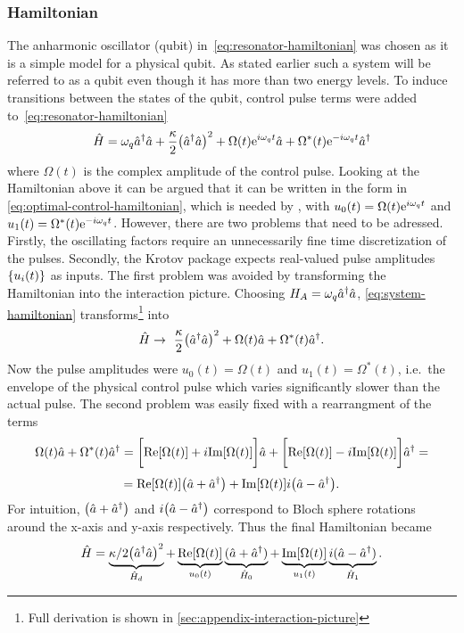 \documentclass[main.tex]{subfiles}
\begin{document}
\subsubsection{Hamiltonian}
The anharmonic oscillator (qubit) in~\cref{eq:resonator-hamiltonian} was chosen as it is a simple model for a physical qubit.
As stated earlier such a system will be referred to as a qubit even though it has more than two energy levels.
To induce transitions between the states of the qubit, control pulse terms were added to~\cref{eq:resonator-hamiltonian}
\begin{equation}
    \hat{H} = \omega_{q} \hat{a}^\dagger\hat{a} + \frac{\kappa}{2} \qty(\hat{a}^\dagger\hat{a})^2 + \Omega(t)\mathrm{e}^{i\omega_{q}t}\hat{a} + \Omega^*(t)\mathrm{e}^{-i\omega_{q}t}\hat{a}^\dagger
    \label{eq:system-hamiltonian}
\end{equation}
where \( \Omega(t) \) is the complex amplitude of the control pulse.
Looking at the Hamiltonian above it can be argued that it can be written in the form in \cref{eq:optimal-control-hamiltonian}, which is needed by \krotov{}, with \( u_0(t) = \Omega(t)\mathrm{e}^{i\omega_{q}t} \) and \( u_1(t) = \Omega^*(t)\mathrm{e}^{-i\omega_{q}t} \).
However, there are two problems that need to be adressed.
Firstly, the oscillating factors require an unnecessarily fine time discretization of the pulses.
Secondly, the Krotov package expects real-valued pulse amplitudes \( \qty{u_i(t)} \) as inputs.
The first problem was avoided by transforming the Hamiltonian into the interaction picture.
Choosing \( H_A = \omega_{q} \hat{a}^\dagger\hat{a} \), \cref{eq:system-hamiltonian} transforms\footnote{Full derivation is shown in \cref{sec:appendix-interaction-picture}} into
\begin{equation}
    \hat{H} \rightarrow~ \frac{\kappa}{2}\qty(\hat{a}^\dagger\hat{a})^2 + \Omega(t)\hat{a} + \Omega^*(t)\hat{a}^\dagger.
    \label{eq:krotov-hamiltonian-rotating}
\end{equation}
Now the pulse amplitudes were \( u_0(t) = \Omega(t) \) and \( u_1(t) = \Omega^*(t) \), i.e.\ the envelope of the physical control pulse which varies significantly slower than the actual pulse.
The second problem was easily fixed with a rearrangment of the terms
\[ \Omega(t)\hat{a} + \Omega^*(t)\hat{a}^\dagger = \bigg[\text{Re}\qty[\Omega(t)]+i\text{Im}\qty[\Omega(t)]\bigg]\hat{a} + \bigg[\text{Re}\qty[\Omega(t)]-i\text{Im}\qty[\Omega(t)]\bigg]\hat{a}^\dagger = \]
\[ = \text{Re}\qty[\Omega(t)]\qty(\hat{a} + \hat{a}^\dagger) + \text{Im}\qty[\Omega(t)]i\qty(\hat{a} - \hat{a}^\dagger). \]
For intuition, \( \qty(\hat{a} + \hat{a}^\dagger) \) and \( i\qty(\hat{a} - \hat{a}^\dagger) \) correspond to Bloch sphere rotations around the x-axis and y-axis respectively. 
Thus the final Hamiltonian became
\begin{equation}
    \hat{H} = \underbrace{\kappa/2\qty(\hat{a}^\dagger\hat{a})^2}_{\hat{H}_d} + \underbrace{\text{Re}\qty[\Omega(t)]}_{u_0(t)}\underbrace{(\hat{a} + \hat{a}^\dagger)}_{\hat{H}_0} + \underbrace{\text{Im}\qty[\Omega(t)]}_{u_1(t)}\underbrace{i(\hat{a} - \hat{a}^\dagger)}_{\hat{H}_1} .
    \label{eq:system-hamiltonian-rotating}
\end{equation}
\end{document}
